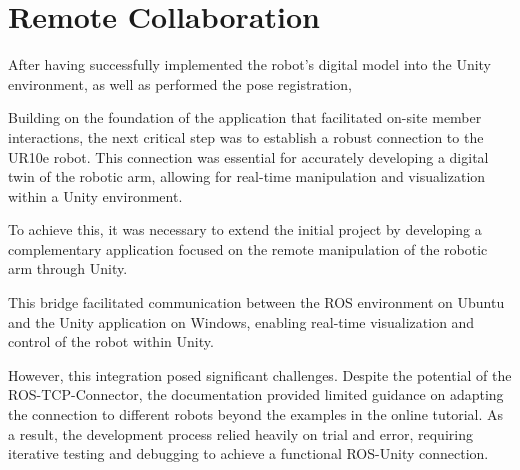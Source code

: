             

\section{Remote Collaboration}

    After having successfully implemented the robot's digital model into the Unity environment, as well as performed the pose registration, 



    Building on the foundation of the application that facilitated on-site member interactions, the next critical step was to establish a robust connection to the UR10e robot. This connection was essential for accurately developing a digital twin of the robotic arm, allowing for real-time manipulation and visualization within a Unity environment.

    To achieve this, it was necessary to extend the initial project by developing a complementary application focused on the remote manipulation 
    of the robotic arm through Unity. 

    This bridge facilitated communication between the ROS environment on Ubuntu and the Unity application on Windows, enabling real-time visualization 
    and control of the robot within Unity.

    However, this integration posed significant challenges. Despite the potential of the ROS-TCP-Connector, the documentation provided limited guidance 
    on adapting the connection to different robots beyond the examples in the online tutorial. As a result, the development process relied heavily on 
    trial and error, requiring iterative testing and debugging to achieve a functional ROS-Unity connection.


